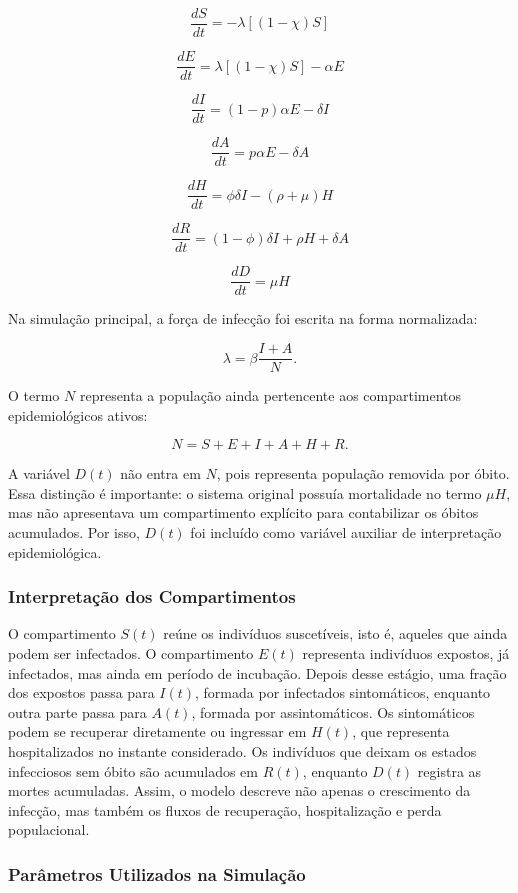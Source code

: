 \[
    \frac{dS}{dt}=-\lambda[(1-\chi)S]
\]

\[
    \frac{dE}{dt}=\lambda[(1-\chi)S]-\alpha E
\]

\[
    \frac{dI}{dt}=(1-p)\alpha E-\delta I
\]

\[
    \frac{dA}{dt}=p\alpha E-\delta A
\]

\[
    \frac{dH}{dt}=\phi\delta I-(\rho+\mu)H
\]

\[
    \frac{dR}{dt}=(1-\phi)\delta I+\rho H+\delta A
\]

\[
    \frac{dD}{dt}=\mu H
\]

Na simulação principal, a força de infecção foi escrita na forma normalizada:

\[
    \lambda=\beta\frac{I+A}{N}.
\]

O termo \(N\) representa a população ainda pertencente aos compartimentos epidemiológicos ativos:

\[
    N=S+E+I+A+H+R.
\]

A variável \(D(t)\) não entra em \(N\), pois representa população removida por óbito. Essa distinção é importante: o sistema original possuía mortalidade no termo \(\mu H\), mas não apresentava um compartimento explícito para contabilizar os óbitos acumulados. Por isso, \(D(t)\) foi incluído como variável auxiliar de interpretação epidemiológica.

\subsubsection{Interpretação dos Compartimentos}

O compartimento \(S(t)\) reúne os indivíduos suscetíveis, isto é, aqueles que ainda podem ser infectados. O compartimento \(E(t)\) representa indivíduos expostos, já infectados, mas ainda em período de incubação. Depois desse estágio, uma fração dos expostos passa para \(I(t)\), formada por infectados sintomáticos, enquanto outra parte passa para \(A(t)\), formada por assintomáticos. Os sintomáticos podem se recuperar diretamente ou ingressar em \(H(t)\), que representa hospitalizados no instante considerado. Os indivíduos que deixam os estados infecciosos sem óbito são acumulados em \(R(t)\), enquanto \(D(t)\) registra as mortes acumuladas. Assim, o modelo descreve não apenas o crescimento da infecção, mas também os fluxos de recuperação, hospitalização e perda populacional.

\subsubsection{Parâmetros Utilizados na Simulação}

